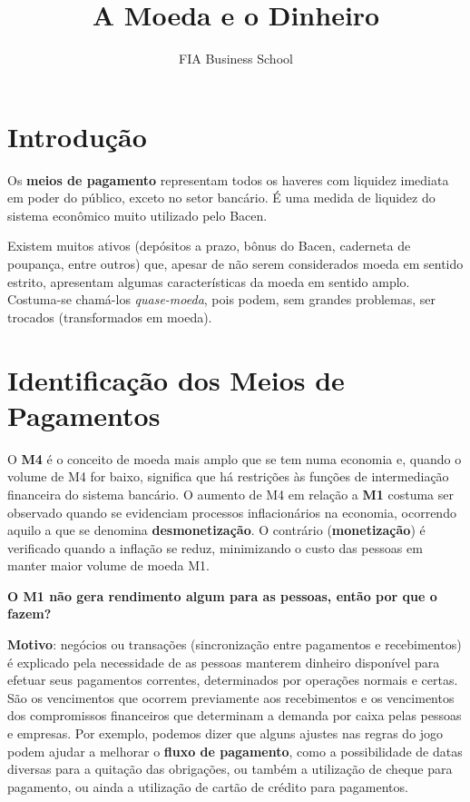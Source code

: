 \documentclass{article}\usepackage[]{graphicx}\usepackage[]{xcolor}
\title{A Moeda e o Dinheiro}
\author{FIA Business School}
\begin{document}
\maketitle
\section*{Introdução}

Os \textbf{meios de pagamento} representam todos os haveres com liquidez imediata em poder do público, 
exceto no setor bancário. É uma medida de liquidez do sistema econômico muito utilizado pelo Bacen.\par

Existem muitos ativos (depósitos a prazo, bônus do Bacen, caderneta de poupança, entre outros) que, 
apesar de não serem considerados moeda em sentido estrito, apresentam algumas características da 
moeda em sentido amplo. Costuma-se chamá-los \textit{quase-moeda}, pois podem, sem grandes problemas, ser 
trocados (transformados em moeda).\par

\section*{Identificação dos Meios de Pagamentos}

O \textbf{M4} é o conceito de moeda mais amplo que se tem numa economia e, quando o volume de M4 for baixo, 
significa que há restrições às funções de intermediação financeira do sistema bancário. O aumento 
de M4 em relação a \textbf{M1} costuma ser observado quando se evidenciam processos inflacionários na economia, 
ocorrendo aquilo a que se denomina \textbf{desmonetização}. O contrário (\textbf{monetização}) é verificado quando a 
inflação se reduz, minimizando o custo das pessoas em manter maior volume de moeda M1.\par

\textbf{O M1 não gera rendimento algum para as pessoas, então por que o fazem?}\par

\textbf{Motivo}: negócios ou transações (sincronização entre pagamentos e recebimentos) é explicado pela 
necessidade de as pessoas manterem dinheiro disponível para efetuar seus pagamentos correntes, 
determinados por operações normais e certas. São os vencimentos que ocorrem previamente aos 
recebimentos e os vencimentos dos compromissos financeiros que determinam a demanda por caixa 
pelas pessoas e empresas. Por exemplo, podemos dizer que alguns ajustes nas regras do jogo podem 
ajudar a melhorar o \textbf{fluxo de pagamento}, como a possibilidade de datas diversas para a quitação 
das obrigações, ou também a utilização de cheque para pagamento, ou ainda a utilização de cartão 
de crédito para pagamentos.\par
\end{document}
